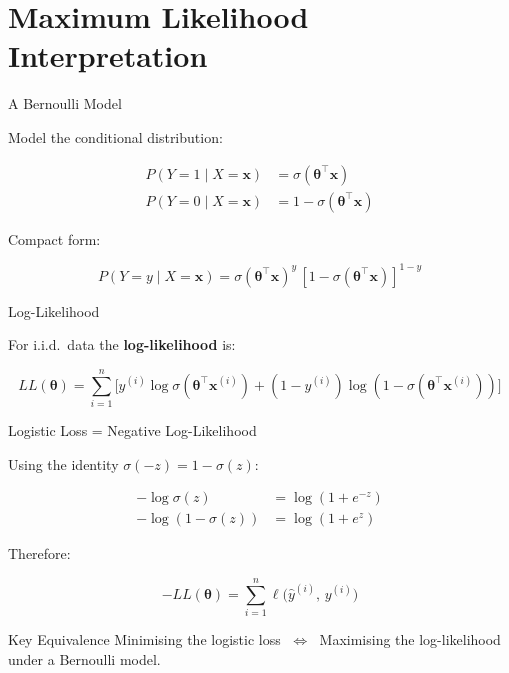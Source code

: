 \documentclass[aspectratio=169, professionalfonts]{beamer}
\begin{document}
\section{Maximum Likelihood Interpretation}

\begin{frame}{A Bernoulli Model}

Model the conditional distribution:

\begin{align*}
P(Y=1\mid X=\mathbf{x}) &= \sigma(\bm{\theta}^\top\mathbf{x}) \\[4pt]
P(Y=0\mid X=\mathbf{x}) &= 1 - \sigma(\bm{\theta}^\top\mathbf{x})
\end{align*}

Compact form:

$$P(Y=y\mid X=\mathbf{x})
  = \sigma(\bm{\theta}^\top\mathbf{x})^{y}\,
    [1-\sigma(\bm{\theta}^\top\mathbf{x})]^{1-y}$$

\end{frame}

\begin{frame}{Log-Likelihood}

For i.i.d.\ data the \textbf{log-likelihood} is:

$$LL(\bm{\theta})
  = \sum_{i=1}^{n}\bigl[
      y^{(i)}\log\sigma(\bm{\theta}^\top\mathbf{x}^{(i)})
    + (1-y^{(i)})\log(1-\sigma(\bm{\theta}^\top\mathbf{x}^{(i)}))
    \bigr]$$

\end{frame}

\begin{frame}{Logistic Loss = Negative Log-Likelihood}

Using the identity $\sigma(-z) = 1 - \sigma(z)$:

\begin{align*}
-\!\log\sigma(z)       &= \log(1+e^{-z}) \\
-\!\log(1-\sigma(z))   &= \log(1+e^{z})
\end{align*}

Therefore:

$$\boxed{-LL(\bm{\theta})
  = \sum_{i=1}^{n}\ell\!\bigl(\hat{y}^{(i)},\, y^{(i)}\bigr)}$$

\bigskip

\begin{alertblock}{Key Equivalence}
Minimising the logistic loss $\;\Longleftrightarrow\;$
Maximising the log-likelihood under a Bernoulli model.
\end{alertblock}

\end{frame}
\end{document}
